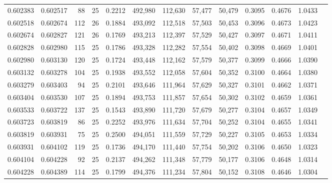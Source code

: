 \begin{tabular}{rrrrrrrrrrrrr}
0.602383 & 0.602517 &    88 &  25 &                                     0.2212 & 492,980 & 112,630 &  57,477 &  50,479 & 0.3095 & 0.4676 & 1.0433 \\
0.602518 & 0.602674 &   112 &  26 &                                     0.1884 & 493,092 & 112,518 &  57,503 &  50,453 & 0.3096 & 0.4673 & 1.0423 \\
0.602674 & 0.602827 &   121 &  26 &                                     0.1769 & 493,213 & 112,397 &  57,529 &  50,427 & 0.3097 & 0.4671 & 1.0411 \\
0.602828 & 0.602980 &   115 &  25 &                                     0.1786 & 493,328 & 112,282 &  57,554 &  50,402 & 0.3098 & 0.4669 & 1.0401 \\
0.602980 & 0.603130 &   120 &  25 &                                     0.1724 & 493,448 & 112,162 &  57,579 &  50,377 & 0.3099 & 0.4666 & 1.0390 \\
0.603132 & 0.603278 &   104 &  25 &                                     0.1938 & 493,552 & 112,058 &  57,604 &  50,352 & 0.3100 & 0.4664 & 1.0380 \\
0.603279 & 0.603403 &    94 &  25 &                                     0.2101 & 493,646 & 111,964 &  57,629 &  50,327 & 0.3101 & 0.4662 & 1.0371 \\
0.603404 & 0.603530 &   107 &  25 &                                     0.1894 & 493,753 & 111,857 &  57,654 &  50,302 & 0.3102 & 0.4659 & 1.0361 \\
0.603533 & 0.603722 &   137 &  25 &                                     0.1543 & 493,890 & 111,720 &  57,679 &  50,277 & 0.3104 & 0.4657 & 1.0349 \\
0.603723 & 0.603819 &    86 &  25 &                                     0.2252 & 493,976 & 111,634 &  57,704 &  50,252 & 0.3104 & 0.4655 & 1.0341 \\
0.603819 & 0.603931 &    75 &  25 &                                     0.2500 & 494,051 & 111,559 &  57,729 &  50,227 & 0.3105 & 0.4653 & 1.0334 \\
0.603931 & 0.604102 &   119 &  25 &                                     0.1736 & 494,170 & 111,440 &  57,754 &  50,202 & 0.3106 & 0.4650 & 1.0323 \\
0.604104 & 0.604228 &    92 &  25 &                                     0.2137 & 494,262 & 111,348 &  57,779 &  50,177 & 0.3106 & 0.4648 & 1.0314 \\
0.604228 & 0.604389 &   114 &  25 &                                     0.1799 & 494,376 & 111,234 &  57,804 &  50,152 & 0.3108 & 0.4646 & 1.0304 \\

\end{tabular}

